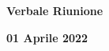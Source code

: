 \begin{center}
  \Huge\textbf{Verbale Riunione}
\end{center}

\begin{center}
  \LARGE\textbf{01 Aprile 2022}
\end{center}

\bigskip
\bigskip
\bigskip
